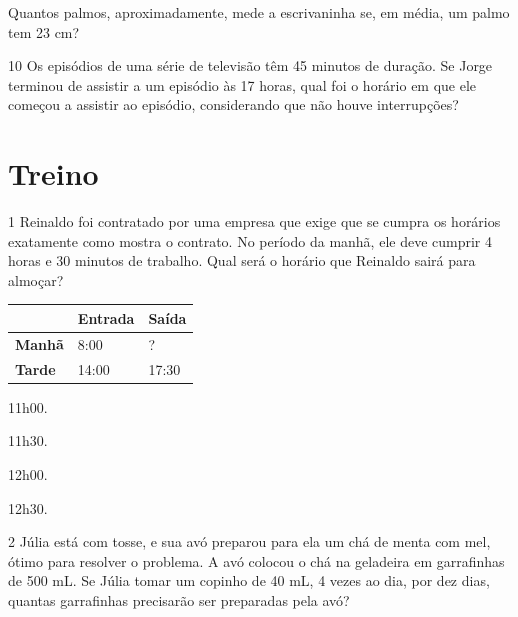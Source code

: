 \begin{escolha}
\item Quantos palmos,
aproximadamente, mede a escrivaninha se, em média, um palmo tem 23 cm?
\end{escolha}

\num{10} Os episódios de uma série de televisão têm 45 minutos de duração.
Se Jorge terminou de assistir a um episódio às 17 horas, qual foi o
horário em que ele começou a assistir ao episódio, considerando que não houve interrupções?

\pagebreak
\section*{Treino}

\num{1} Reinaldo foi contratado por uma empresa que exige que se cumpra os horários exatamente como mostra o contrato. No período da manhã, ele deve
cumprir 4 horas e 30 minutos de trabalho. Qual será o horário que
Reinaldo sairá para almoçar?

\begin{longtable}[]{@{}lll@{}}
\toprule
& \textbf{Entrada} & \textbf{Saída}\tabularnewline
\midrule
\endhead
\hline
\textbf{Manhã} & 8:00 & ?\tabularnewline
\hline
\textbf{Tarde} & 14:00 & 17:30\tabularnewline
\hline
\bottomrule
\end{longtable}

\begin{escolha}
\begin{multicols}{2}

\item 11h00.

\item 11h30.
\end{multicols}


\begin{multicols}{2}

\item 12h00.

\item 12h30.
\end{multicols}
\end{escolha}


\num{2} Júlia está com tosse, e sua avó preparou para ela um chá de menta com mel, ótimo para resolver o problema. A avó colocou o chá na geladeira em garrafinhas de 500 mL. Se Júlia tomar um copinho de 40 mL, 4 vezes ao dia, por dez dias, quantas garrafinhas precisarão ser preparadas pela avó?

